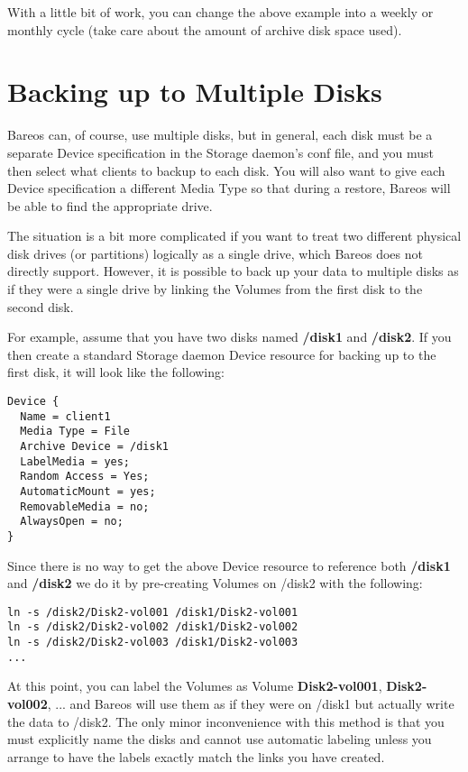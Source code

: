 With a little bit of work, you can change the above example into a weekly or
monthly cycle (take care about the amount of archive disk space used).

\section{Backing up to Multiple Disks}
\label{MultipleDisks}

Bareos can, of course, use multiple disks, but in general, each disk must be a
separate Device specification in the Storage daemon's conf file, and you must
then select what clients to backup to each disk. You will also want to
give each Device specification a different Media Type so that during
a restore, Bareos will be able to find the appropriate drive.

The situation is a bit more complicated if you want to treat two different
physical disk drives (or partitions) logically as a single drive, which
Bareos does not directly support.  However, it is possible to back up your
data to multiple disks as if they were a single drive by linking the
Volumes from the first disk to the second disk.

For example, assume that you have two disks named {\bf /disk1} and {\bf
/disk2}. If you then create a standard Storage daemon Device resource for
backing up to the first disk, it will look like the following:

\footnotesize
\begin{verbatim}
Device {
  Name = client1
  Media Type = File
  Archive Device = /disk1
  LabelMedia = yes;
  Random Access = Yes;
  AutomaticMount = yes;
  RemovableMedia = no;
  AlwaysOpen = no;
}
\end{verbatim}
\normalsize

Since there is no way to get the above Device resource to reference both {\bf
/disk1} and {\bf /disk2} we do it by pre-creating Volumes on /disk2 with the
following:

\footnotesize
\begin{verbatim}
ln -s /disk2/Disk2-vol001 /disk1/Disk2-vol001
ln -s /disk2/Disk2-vol002 /disk1/Disk2-vol002
ln -s /disk2/Disk2-vol003 /disk1/Disk2-vol003
...
\end{verbatim}
\normalsize

At this point, you can label the Volumes as Volume {\bf Disk2-vol001}, {\bf
Disk2-vol002}, ... and Bareos will use them as if they were on /disk1 but
actually write the data to /disk2. The only minor inconvenience with this
method is that you must explicitly name the disks and cannot use automatic
labeling unless you arrange to have the labels exactly match the links you
have created.

